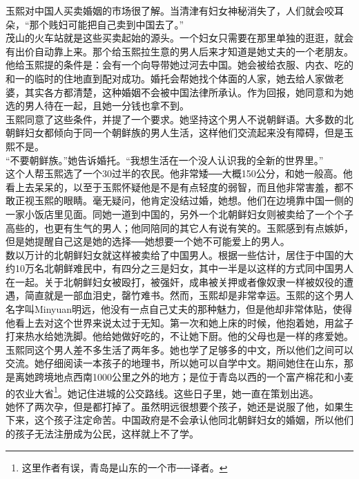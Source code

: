 玉熙对中国人买卖婚姻的市场很了解。当清津有妇女神秘消失了，人们就会咬耳朵，“那个贱妇可能把自己卖到中国去了。”\\

茂山的火车站就是这些买卖起始的源头。一个妇女只需要在那里单独的逛逛，就会有出价自动靠上来。那个给玉熙拉生意的男人后来才知道是她丈夫的一个老朋友。他给玉熙提的条件是：会有一个向导带她过河去中国。她会被给衣服、内衣、吃的和一的临时的住地直到配对成功。婚托会帮她找个体面的人家，她去给人家做老婆，其实各方都清楚，这种婚姻不会被中国法律所承认。作为回报，她同意和为她选的男人待在一起，且她一分钱也拿不到。\\

玉熙同意了这些条件，并提了一个要求。她坚持这个男人不说朝鲜语。大多数的北朝鲜妇女都倾向于同一个朝鲜族的男人生活，这样他们交流起来没有障碍，但是玉熙不是。\\

“不要朝鲜族。”她告诉婚托。“我想生活在一个没人认识我的全新的世界里。”\\

这个人帮玉熙选了一个30过半的农民。他非常矮──大概150公分，和她一般高。他看上去呆呆的，以至于玉熙怀疑他是不是有点轻度的弱智，而且他非常害羞，都不敢正视玉熙的眼睛。毫无疑问，他肯定没结过婚，她想。他们在边境靠中国一侧的一家小饭店里见面。同她一道到中国的，另外一个北朝鲜妇女则被卖给了一个个子高些的，也更有生气的男人；他同陪同的其它人有说有笑的。玉熙感到有点嫉妒，但是她提醒自己这是她的选择──她想要一个她不可能爱上的男人。\\

数以万计的北朝鲜妇女就这样被卖给了中国男人。根据一些估计，居住于中国的大约10万名北朝鲜难民中，有四分之三是妇女，其中一半是以这样的方式同中国男人在一起。关于北朝鲜妇女被殴打，被强奸，成串被关押或者像奴隶一样被奴役的遭遇，简直就是一部血泪史，罄竹难书。然而，玉熙却是非常幸运。玉熙的这个男人名字叫Minyuan明远，他没有一点自己丈夫的那种魅力，但是他却非常体贴，使得他看上去对这个世界来说太过于无知。第一次和她上床的时候，他抱着她，用盆子打来热水给她洗脚。他给她做好吃的，不让她下厨。他的父母也是一样的疼爱她。\\

玉熙同这个男人差不多生活了两年多。她也学了足够多的中文，所以他们之间可以交流。她仔细阅读一本孩子的地理书，所以她可以自学中文。期间她住在山东，那是离她跨境地点西南1000公里之外的地方；是位于青岛以西的一个富产棉花和小麦的农业大省\footnote{这里作者有误，青岛是山东的一个市──译者。}。她记住进城的公交路线。这些日子里，她一直在策划出逃。\\

她怀了两次孕，但是都打掉了。虽然明远很想要个孩子，她还是说服了他，如果生下来，这个孩子注定命苦。中国政府是不会承认他同北朝鲜妇女的婚姻，所以他们的孩子无法注册成为公民，这样就上不了学。\\

